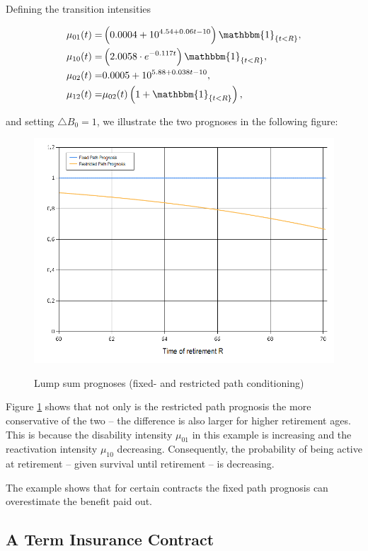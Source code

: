 \documentclass{book}
\newcommand{\1}[1]{\mathbbm{1}_{\left\lbrace #1 \right\rbrace}}
\theoremstyle{break}
\theoremstyle{remark}
\numberwithin{equation}{section}
\begin{document}
Defining the transition intensities

\begin{align*}
	\mu_{01}(t) =& \left(0.0004 + 10^{4.54 + 0.06t - 10}\right) \1{t<R}, \\
	\mu_{10}(t) =& \left(2.0058 \cdot e^{-0.117t}\right) \1{t<R}, \\
	\mu_{02}(t) =& 0.0005 + 10^{5.88 + 0.038t - 10}, \\
	\mu_{12}(t) =& \mu_{02}(t) \left( 1 + \1{t<R} \right),
\end{align*}

and setting $\triangle B_0=1$, we illustrate the two prognoses in the following figure:

\begin{figure}[H]
	\centering
	\caption{Lump sum prognoses (fixed- and restricted path conditioning)}
	\includegraphics[width=\textwidth]{LumpSum} \label{LumpFigure}
\end{figure}

Figure \ref{LumpFigure} shows that not only is the restricted path prognosis the more conservative of the two -- the difference is also larger for higher retirement ages. This is because the disability intensity $\mu_{01}$ in this example is increasing and the reactivation intensity $\mu_{10}$ decreasing. Consequently, the probability of being active at retirement -- given survival until retirement -- is decreasing.

The example shows that for certain contracts the fixed path prognosis can overestimate the benefit paid out.

\subsection{A Term Insurance Contract}
\end{document}
